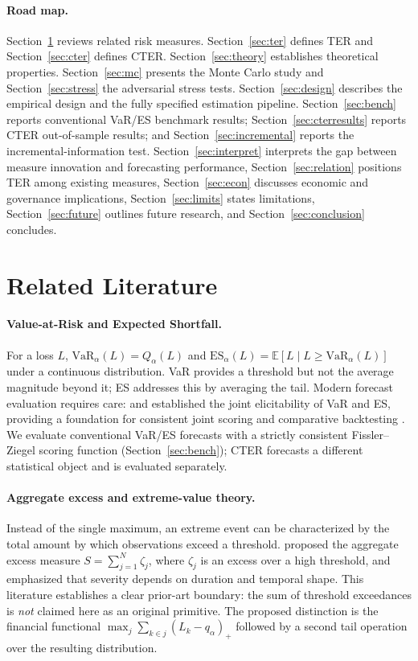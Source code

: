 \documentclass[11pt]{article}
\newcommand{\E}{\mathbb{E}}
\newcommand{\VaR}{\mathrm{VaR}}
\newcommand{\ES}{\mathrm{ES}}
\begin{document}
\paragraph{Road map.} Section~\ref{sec:lit} reviews related risk measures. Section~\ref{sec:ter} defines
TER and Section~\ref{sec:cter} defines CTER. Section~\ref{sec:theory} establishes theoretical properties.
Section~\ref{sec:mc} presents the Monte Carlo study and Section~\ref{sec:stress} the adversarial stress
tests. Section~\ref{sec:design} describes the empirical design and the fully specified estimation pipeline.
Section~\ref{sec:bench} reports conventional VaR/ES benchmark results; Section~\ref{sec:cterresults}
reports CTER out-of-sample results; and Section~\ref{sec:incremental} reports the incremental-information
test. Section~\ref{sec:interpret} interprets the gap between measure innovation and forecasting
performance, Section~\ref{sec:relation} positions TER among existing measures, Section~\ref{sec:econ}
discusses economic and governance implications, Section~\ref{sec:limits} states limitations,
Section~\ref{sec:future} outlines future research, and Section~\ref{sec:conclusion} concludes.

\section{Related Literature}\label{sec:lit}

\paragraph{Value-at-Risk and Expected Shortfall.} For a loss $L$, $\VaR_\alpha(L)=Q_\alpha(L)$ and
$\ES_\alpha(L)=\E[L\mid L\ge \VaR_\alpha(L)]$ under a continuous distribution. VaR provides a threshold but
not the average magnitude beyond it; ES addresses this by averaging the tail. Modern forecast evaluation
requires care: \citet{fzg2016} and \citet{fz2016} established the joint elicitability of VaR and ES,
providing a foundation for consistent joint scoring and comparative backtesting
\citep{noldeziegel2017,pzc2019}. We evaluate conventional VaR/ES forecasts with a strictly consistent
Fissler--Ziegel scoring function (Section~\ref{sec:bench}); CTER forecasts a different statistical object
and is evaluated separately.

\paragraph{Aggregate excess and extreme-value theory.} Instead of the single maximum, an extreme event can
be characterized by the total amount by which observations exceed a threshold. \citet{anderson1994}
proposed the aggregate excess measure $S=\sum_{j=1}^{N}\zeta_j$, where $\zeta_j$ is an excess over a high
threshold, and emphasized that severity depends on duration and temporal shape. This literature establishes
a clear prior-art boundary: the sum of threshold exceedances is \emph{not} claimed here as an original
primitive. The proposed distinction is the financial functional $\max_j\sum_{k\in j}(L_k-q_\alpha)_+$
followed by a second tail operation over the resulting distribution.
\end{document}
